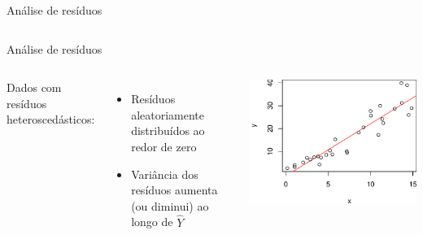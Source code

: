 \documentclass{beamer}\usepackage[]{graphicx}\usepackage[]{color}
\newenvironment{knitrout}{}{} %
\renewenvironment{knitrout}{\setlength{\topsep}{0mm}}{}
\begin{document}
\begin{frame}{Análise de resíduos}
\begin{columns}[c]
\begin{knitrout}
\end{knitrout}
\end{columns}

\end{frame}


\begin{frame}{Análise de resíduos}

\begin{columns}[c]


\small{Dados com resíduos heteroscedásticos:} \pause

\begin{itemize}

\item Resíduos aleatoriamente distribuídos ao redor de zero 

\item Variância dos resíduos aumenta (ou diminui) ao longo de $\hat Y$ 

\end{itemize}


\begin{knitrout}
\color{fgcolor}
\includegraphics[width=1\linewidth]{figure/r6-1} 


\end{knitrout}
\end{columns}
\end{frame}
\end{document}
